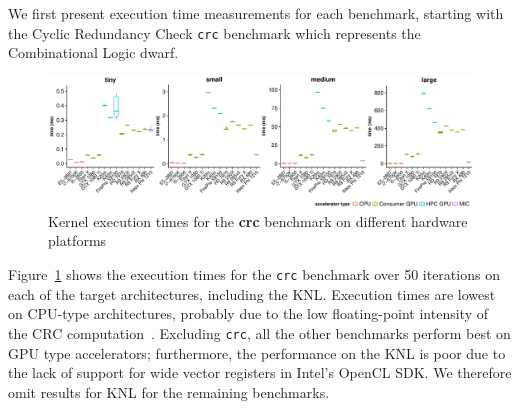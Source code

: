 \documentclass[../document.tex]{subfiles}
\begin{document}
\label{ssec:time}
	
We first present execution time measurements for each benchmark, starting with the Cyclic Redundancy Check {\tt crc} benchmark which represents the Combinational Logic dwarf.

\newcommand{\plotwidth}{0.24\textwidth}

\begin{figure}[t]
	\centering
	\includegraphics[width=\textwidth,keepaspectratio]{figures/new-time-results/generate_crc_row_bandwplot}
	\caption{Kernel execution times for the {\bf crc} benchmark on different hardware platforms}
	\label{fig:time-crc}
\end{figure}



Figure~\ref{fig:time-crc} shows the execution times for the {\tt crc} benchmark over 50 iterations on each of the target architectures, including the KNL.
Execution times are lowest on CPU-type architectures, probably due to the low floating-point intensity of the CRC computation~\cite[Ch. 6]{joshi2016thesis}.
Excluding {\tt crc}, all the other benchmarks perform best on GPU type accelerators; furthermore, the performance on the KNL is poor due to the lack of support for wide vector registers in Intel's OpenCL SDK.
We therefore omit results for KNL for the remaining benchmarks.

\end{document}
